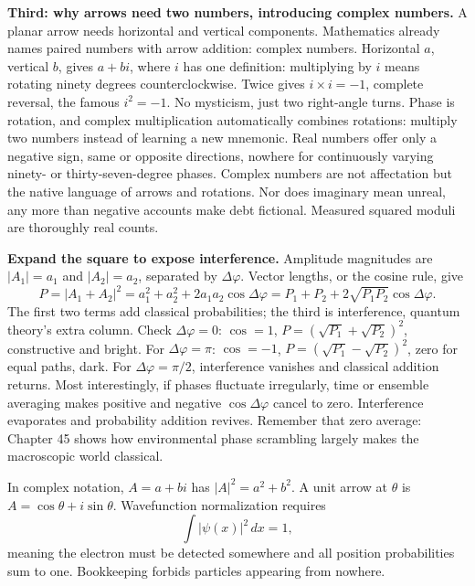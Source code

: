 \textbf{Third: why arrows need two numbers, introducing complex numbers.} A planar arrow needs horizontal and vertical components. Mathematics already names paired numbers with arrow addition: complex numbers. Horizontal \(a\), vertical \(b\), gives \(a + bi\), where \(i\) has one definition: multiplying by \(i\) means rotating ninety degrees counterclockwise. Twice gives \(i \times i = -1\), complete reversal, the famous \(i^2 = -1\). No mysticism, just two right-angle turns. Phase is rotation, and complex multiplication automatically combines rotations: multiply two numbers instead of learning a new mnemonic. Real numbers offer only a negative sign, same or opposite directions, nowhere for continuously varying ninety- or thirty-seven-degree phases. Complex numbers are not affectation but the native language of arrows and rotations. Nor does imaginary mean unreal, any more than negative accounts make debt fictional. Measured squared moduli are thoroughly real counts.

\begin{mathbridge}
\textbf{Expand the square to expose interference.} Amplitude magnitudes are \(|A_1| = a_1\) and \(|A_2| = a_2\), separated by \(\Delta\varphi\). Vector lengths, or the cosine rule, give
\[
P = |A_1 + A_2|^2 = a_1^2 + a_2^2 + 2a_1a_2\cos\Delta\varphi
   = P_1 + P_2 + 2\sqrt{P_1P_2}\cos\Delta\varphi.
\]
The first two terms add classical probabilities; the third is interference, quantum theory's extra column. Check \(\Delta\varphi = 0\): \(\cos = 1\), \(P = (\sqrt{P_1}+\sqrt{P_2})^2\), constructive and bright. For \(\Delta\varphi = \pi\): \(\cos = -1\), \(P = (\sqrt{P_1}-\sqrt{P_2})^2\), zero for equal paths, dark. For \(\Delta\varphi = \pi/2\), interference vanishes and classical addition returns. Most interestingly, if phases fluctuate irregularly, time or ensemble averaging makes positive and negative \(\cos\Delta\varphi\) cancel to zero. Interference evaporates and probability addition revives. Remember that zero average: Chapter 45 shows how environmental phase scrambling largely makes the macroscopic world classical.

In complex notation, \(A = a + bi\) has \(|A|^2 = a^2 + b^2\). A unit arrow at \(\theta\) is \(A = \cos\theta + i\sin\theta\). Wavefunction normalization requires
\[
\int |\psi(x)|^2 \, dx = 1,
\]
meaning the electron must be detected somewhere and all position probabilities sum to one. Bookkeeping forbids particles appearing from nowhere.
\end{mathbridge}

